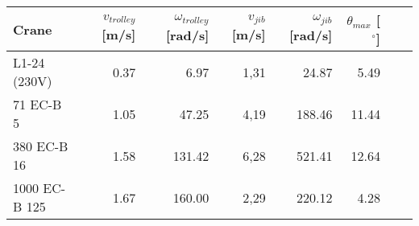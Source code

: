 \documentclass{standalone}
\begin{document}
\begin{tabular}{lrrrrrrr}\toprule
\textbf{Crane}& \textbf{$v_{trolley}$ [m/s]}& \textbf{$\omega_{trolley}$ [rad/s]}& \textbf{$v_{jib}$ [m/s]}& \textbf{$\omega_{jib}$ [rad/s]}& \textbf{$\theta_{max}$ [$^\circ$] } \\
\midrule
L1-24 (230V)  & 0.37                        & 6.97                              & 1,31                    & 24.87                          & 5.49 \\
71 EC-B 5     & 1.05                        & 47.25                              & 4,19                    & 188.46                          & 11.44 \\
380 EC-B 16   & 1.58                        & 131.42                              & 6,28                   & 521.41                          & 12.64 \\
1000 EC-B 125 & 1.67                        & 160.00                              &  2,29                   & 220.12                          & 4.28 \\
    \bottomrule
\end{tabular}
\end{document}
